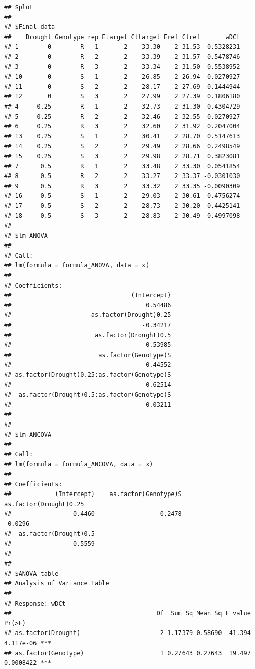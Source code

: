 \documentclass[
]{article}
\begin{document}
\begin{verbatim}
## $plot
## 
## $Final_data
##    Drought Genotype rep Etarget Cttarget Eref Ctref       wDCt
## 1        0        R   1       2    33.30    2 31.53  0.5328231
## 2        0        R   2       2    33.39    2 31.57  0.5478746
## 3        0        R   3       2    33.34    2 31.50  0.5538952
## 10       0        S   1       2    26.85    2 26.94 -0.0270927
## 11       0        S   2       2    28.17    2 27.69  0.1444944
## 12       0        S   3       2    27.99    2 27.39  0.1806180
## 4     0.25        R   1       2    32.73    2 31.30  0.4304729
## 5     0.25        R   2       2    32.46    2 32.55 -0.0270927
## 6     0.25        R   3       2    32.60    2 31.92  0.2047004
## 13    0.25        S   1       2    30.41    2 28.70  0.5147613
## 14    0.25        S   2       2    29.49    2 28.66  0.2498549
## 15    0.25        S   3       2    29.98    2 28.71  0.3823081
## 7      0.5        R   1       2    33.48    2 33.30  0.0541854
## 8      0.5        R   2       2    33.27    2 33.37 -0.0301030
## 9      0.5        R   3       2    33.32    2 33.35 -0.0090309
## 16     0.5        S   1       2    29.03    2 30.61 -0.4756274
## 17     0.5        S   2       2    28.73    2 30.20 -0.4425141
## 18     0.5        S   3       2    28.83    2 30.49 -0.4997098
## 
## $lm_ANOVA
## 
## Call:
## lm(formula = formula_ANOVA, data = x)
## 
## Coefficients:
##                                 (Intercept)  
##                                     0.54486  
##                      as.factor(Drought)0.25  
##                                    -0.34217  
##                       as.factor(Drought)0.5  
##                                    -0.53985  
##                        as.factor(Genotype)S  
##                                    -0.44552  
## as.factor(Drought)0.25:as.factor(Genotype)S  
##                                     0.62514  
##  as.factor(Drought)0.5:as.factor(Genotype)S  
##                                    -0.03211  
## 
## 
## $lm_ANCOVA
## 
## Call:
## lm(formula = formula_ANCOVA, data = x)
## 
## Coefficients:
##            (Intercept)    as.factor(Genotype)S  as.factor(Drought)0.25  
##                 0.4460                 -0.2478                 -0.0296  
##  as.factor(Drought)0.5  
##                -0.5559  
## 
## 
## $ANOVA_table
## Analysis of Variance Table
## 
## Response: wDCt
##                                        Df  Sum Sq Mean Sq F value    Pr(>F)    
## as.factor(Drought)                      2 1.17379 0.58690  41.394 4.117e-06 ***
## as.factor(Genotype)                     1 0.27643 0.27643  19.497 0.0008422 ***

\end{verbatim}
\end{document}
